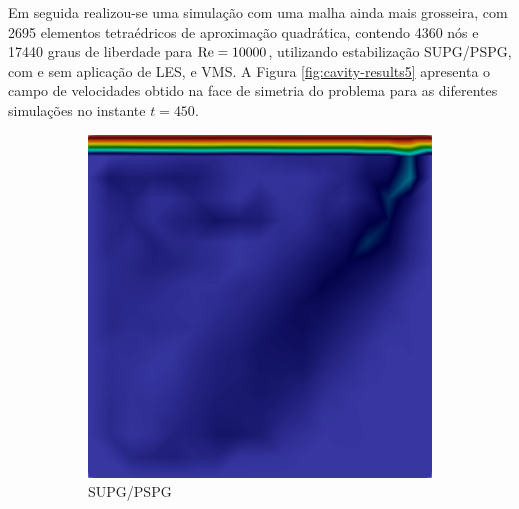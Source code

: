 Em seguida realizou-se uma simulação com uma malha ainda mais grosseira, com 2695 elementos tetraédricos de aproximação quadrática, contendo 4360 nós e 17440 graus de liberdade para $\mathrm{Re}=10000$, utilizando estabilização SUPG/PSPG, com e sem aplicação de LES, e VMS. A Figura \ref{fig:cavity-results5} apresenta o campo de velocidades obtido na face de simetria do problema para as diferentes simulações no instante $t=450$.

\begin{figure}[h!]
    \centering
    \caption{Cavidade tridimensional - Campo de velocidades na face de simetria.}
    \begin{subfigure}{0.32\textwidth}
        \centering
        \includegraphics[width=\linewidth]{Figuras/cavity3D/DNS.png}
        \caption{SUPG/PSPG}
    \end{subfigure}
    \begin{subfigure}{0.32\textwidth}
        \centering

\end{subfigure}
\end{figure}

